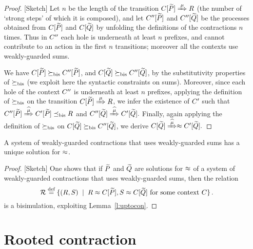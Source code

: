 \begin{proof}{[Sketch]}
Let $n$ be the length of the transition $\ct{\til P}\Arr\mu R$  (the
number of `strong steps' of which it is composed), and  
let $C'' [\widetilde P]$ and $C'' [\widetilde Q]$  be the processes obtained
from  $C [\widetilde P]$ and $C [\widetilde Q]$ by unfolding the definitions
of the contractions $n$ times. Thus in $C''$ each hole is
underneath at least $n$ prefixes, and cannot contribute to an action
in the first $n$ transitions; moreover all the contexts use
weakly-guarded sums. 


We have $C [\widetilde P] \mathrel{\succeq_{\rm{bis}}} C'' [\widetilde P]$, and 
$C [\widetilde Q] \mathrel{\succeq_{\rm{bis}}} C'' [\widetilde Q]$, 
 by the substitutivity  properties of $\mathrel{\succeq_{\rm{bis}}}$ (we exploit here
 the syntactic constraints on sums). Moreover,
 since each hole of the  context $C''$ is underneath at least $n$
 prefixes, applying  
the definition
 of $ \mathrel{\succeq_{\rm{bis}}}$ on the transition 
 $\ct{\til P}\Arr{\mu}  R$, we infer the existence
 of $C'$ such that 
$
\ctpp{\til P}\Arcap{\mu} \ctp{\til P} \mexpaBIS R
$
and 
$
\ctpp{\til Q}\Arcap{\mu}  \ctp{\til Q} 
. $
Finally, again applying the definition of $\mathrel{\succeq_{\rm{bis}}}$ on 
$C [\widetilde Q] \mathrel{\succeq_{\rm{bis}}} C'' [\widetilde Q]$, 
we derive 
$
\ct{\til Q}\Arcap{\mu}  \wb \ctp{\til Q} 
.$
\end{proof}

\begin{theorem}
\label{t:contraBisimulationU}
A system of weakly-guarded contractions
 that uses  weakly-guarded sums    has 
a unique solution 
 for $\approx$.
\end{theorem} 

\begin{proof}{[Sketch]}
One shows that if $\widetilde P$ and $\widetilde Q$ are solutions for $\approx$ of a system of weakly-guarded
contractions that uses weakly-guarded sums,  then the
 relation 
\[{\cal R} \stackrel{\mbox{\scriptsize def}}{=} \{ 
(R,S) \; \mid \; R \approx C [\widetilde P], S \approx C [\widetilde Q] \mbox{ for some context
$C$} \} \, . 
\]
 is a bisimulation, exploiting 
 Lemma~\ref{l:uptocon}.
\end{proof} 


\section{Rooted contraction}
\label{ss:new}

